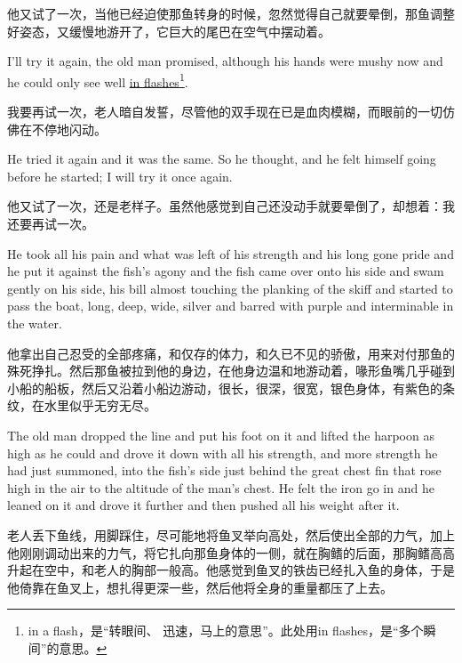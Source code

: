 \begin{paracol}{2}
\switchcolumn

他又试了一次，当他已经迫使那鱼转身的时候，忽然觉得自己就要晕倒，那鱼调整好姿态，又缓慢地游开了，它巨大的尾巴在空气中摆动着。

\switchcolumn*

I'll try it again, the old man promised, although his hands were \gls{mushy}
now and he could only see well \uline{in flashes}\footnote{in a flash，是“转眼间、
  迅速，马上的意思”。此处用in flashes，是“多个瞬间”的意思。}.

\switchcolumn

我要再试一次，老人暗自发誓，尽管他的双手现在已是血肉模糊，而眼前的一切仿佛在不停地闪动。

\switchcolumn*

He tried it again and it was the same. So he thought, and he felt himself
going before he started; I will try it once again.

\switchcolumn

他又试了一次，还是老样子。虽然他感觉到自己还没动手就要晕倒了，却想着：我还要再试一次。

\switchcolumn*

He took all his pain and what was left of his strength and his long gone
pride and he put it against the fish's \gls{agony} and the fish came over
onto his side and swam gently on his side, his bill almost touching the
planking of the skiff and started to pass the boat, long, deep, wide, silver
and \gls{barred} with purple and \gls{interminable} in the water.

\switchcolumn

他拿出自己忍受的全部疼痛，和仅存的体力，和久已不见的骄傲，用来对付那鱼的殊死挣扎。然后那鱼被拉到他的身边，在他身边温和地游动着，喙形鱼嘴几乎碰到小船的船板，然后又沿着小船边游动，很长，很深，很宽，银色身体，有紫色的条纹，在水里似乎无穷无尽。

\switchcolumn*

The old man dropped the line and put his foot on it and lifted the harpoon
as high as he could and drove it down with all his strength, and more
strength he had just \gls{summoned}, into the fish's side just behind the
great \gls{chest} fin that rose high in the air to the \gls{altitude} of the
man's chest. He felt the \gls{iron} go in and he leaned on it and drove it
further and then pushed all his weight after it.

\switchcolumn

老人丢下鱼线，用脚踩住，尽可能地将鱼叉举向高处，然后使出全部的力气，加上他刚刚调动出来的力气，将它扎向那鱼身体的一侧，就在胸鳍的后面，那胸鳍高高升起在空中，和老人的胸部一般高。他感觉到鱼叉的铁齿已经扎入鱼的身体，于是他倚靠在鱼叉上，想扎得更深一些，然后他将全身的重量都压了上去。


\end{paracol}
